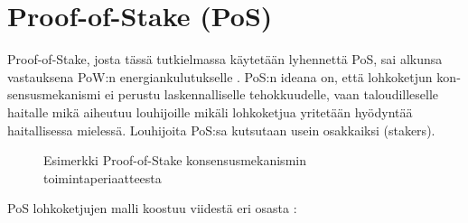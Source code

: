 \section{Proof-of-Stake (PoS)\label{pos}}

\begin{otherlanguage}{english}\sloppy

Proof-of-Stake, josta tässä tutkielmassa käytetään lyhennettä PoS, sai alkunsa vastauksena PoW:n energiankulutukselle \cite{pos2}. PoS:n ideana on, että lohkoketjun konsensusmekanismi ei perustu laskennalliselle tehokkuudelle, vaan taloudilleselle haitalle mikä aiheutuu louhijoille mikäli lohkoketjua yritetään hyödyntää haitallisessa mielessä. Louhijoita PoS:sa kutsutaan usein osakkaiksi (stakers).

\vspace{1mm}

\begin{figure}[!htbp]
\centering
{}
\caption{Esimerkki Proof-of-Stake konsensusmekanismin toimintaperiaatteesta}
\label{fig_pos}
\end{figure}

\vspace{1mm}

PoS lohkoketjujen malli koostuu viidestä eri osasta \cite{pos1, pos2}:


\end{otherlanguage}
